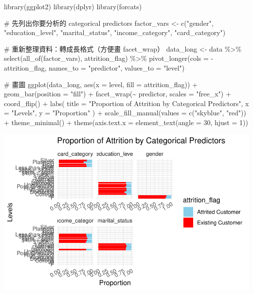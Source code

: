\documentclass[
  letterpaper,
  DIV=11,
  numbers=noendperiod]{scrartcl}
\newenvironment{Shaded}{\begin{snugshade}}{\end{snugshade}}
\newcommand{\AttributeTok}[1]{\textcolor[rgb]{0.40,0.45,0.13}{#1}}
\newcommand{\CommentTok}[1]{\textcolor[rgb]{0.37,0.37,0.37}{#1}}
\newcommand{\DecValTok}[1]{\textcolor[rgb]{0.68,0.00,0.00}{#1}}
\newcommand{\FunctionTok}[1]{\textcolor[rgb]{0.28,0.35,0.67}{#1}}
\newcommand{\NormalTok}[1]{\textcolor[rgb]{0.00,0.23,0.31}{#1}}
\newcommand{\OtherTok}[1]{\textcolor[rgb]{0.00,0.23,0.31}{#1}}
\newcommand{\SpecialCharTok}[1]{\textcolor[rgb]{0.37,0.37,0.37}{#1}}
\newcommand{\StringTok}[1]{\textcolor[rgb]{0.13,0.47,0.30}{#1}}
\begin{document}
\begin{Shaded}
\begin{Highlighting}[]
\FunctionTok{library}\NormalTok{(ggplot2)}
\FunctionTok{library}\NormalTok{(dplyr)}
\FunctionTok{library}\NormalTok{(forcats)}

\CommentTok{\# 先列出你要分析的 categorical predictors}
\NormalTok{factor\_vars }\OtherTok{\textless{}{-}} \FunctionTok{c}\NormalTok{(}\StringTok{"gender"}\NormalTok{, }\StringTok{"education\_level"}\NormalTok{, }\StringTok{"marital\_status"}\NormalTok{, }\StringTok{"income\_category"}\NormalTok{, }\StringTok{"card\_category"}\NormalTok{)}

\CommentTok{\# 重新整理資料：轉成長格式（方便畫 facet\_wrap）}
\NormalTok{data\_long }\OtherTok{\textless{}{-}}\NormalTok{ data }\SpecialCharTok{\%\textgreater{}\%}
  \FunctionTok{select}\NormalTok{(}\FunctionTok{all\_of}\NormalTok{(factor\_vars), attrition\_flag) }\SpecialCharTok{\%\textgreater{}\%}
  \FunctionTok{pivot\_longer}\NormalTok{(}\AttributeTok{cols =} \SpecialCharTok{{-}}\NormalTok{attrition\_flag, }\AttributeTok{names\_to =} \StringTok{"predictor"}\NormalTok{, }\AttributeTok{values\_to =} \StringTok{"level"}\NormalTok{)}

\CommentTok{\# 畫圖}
\FunctionTok{ggplot}\NormalTok{(data\_long, }\FunctionTok{aes}\NormalTok{(}\AttributeTok{x =}\NormalTok{ level, }\AttributeTok{fill =}\NormalTok{ attrition\_flag)) }\SpecialCharTok{+}
  \FunctionTok{geom\_bar}\NormalTok{(}\AttributeTok{position =} \StringTok{"fill"}\NormalTok{) }\SpecialCharTok{+}
  \FunctionTok{facet\_wrap}\NormalTok{(}\SpecialCharTok{\textasciitilde{}}\NormalTok{ predictor, }\AttributeTok{scales =} \StringTok{"free\_x"}\NormalTok{) }\SpecialCharTok{+}
  \FunctionTok{coord\_flip}\NormalTok{() }\SpecialCharTok{+}
  \FunctionTok{labs}\NormalTok{(}
    \AttributeTok{title =} \StringTok{"Proportion of Attrition by Categorical Predictors"}\NormalTok{,}
    \AttributeTok{x =} \StringTok{"Levels"}\NormalTok{,}
    \AttributeTok{y =} \StringTok{"Proportion"}
\NormalTok{  ) }\SpecialCharTok{+}
  \FunctionTok{scale\_fill\_manual}\NormalTok{(}\AttributeTok{values =} \FunctionTok{c}\NormalTok{(}\StringTok{"skyblue"}\NormalTok{, }\StringTok{"red"}\NormalTok{)) }\SpecialCharTok{+}
  \FunctionTok{theme\_minimal}\NormalTok{() }\SpecialCharTok{+}
  \FunctionTok{theme}\NormalTok{(}\AttributeTok{axis.text.x =} \FunctionTok{element\_text}\NormalTok{(}\AttributeTok{angle =} \DecValTok{30}\NormalTok{, }\AttributeTok{hjust =} \DecValTok{1}\NormalTok{))}
\end{Highlighting}
\end{Shaded}

\includegraphics{Tackling-Attrition-at-Tifosi-Bank_files/figure-pdf/unnamed-chunk-13-1.pdf}
\end{document}
